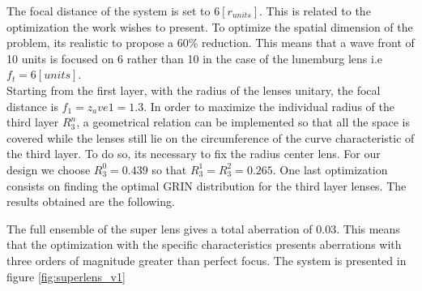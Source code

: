 The focal distance of the system is set to $6 [r_{units}]$. This is related to the optimization the work wishes to present. To optimize the spatial dimension of the problem, its realistic to propose a $60\%$ reduction. This means that a wave front of 10 units is focused on 6 rather than 10 in the case of the lunemburg lens i.e $f_t = 6 [units]$. \\

Starting from the first layer, with the radius of the lenses unitary, the focal distance is $f_1 = z_ave1=1.3$.  In order to maximize the individual radius of the third layer $R_3^n$, a geometrical relation can be implemented so that all the space is covered while the lenses still lie on the circumference of the curve characteristic of the third layer. To do so, its necessary to fix the radius center lens. For our design we choose $R_3^0 = 0.439$ so that $R_3^1 =R_3^2 = 0.265$. One last optimization consists on finding the optimal GRIN distribution for the third layer lenses. The results obtained are the following.

\begin{center}
    \begin{table}[H]
    \end{table}
\end{center}

The full ensemble of the super lens gives a total aberration of 0.03. This means that the optimization with the specific characteristics presents aberrations with three orders of magnitude greater than perfect focus. The system is presented in figure \ref{fig:superlens_v1}

